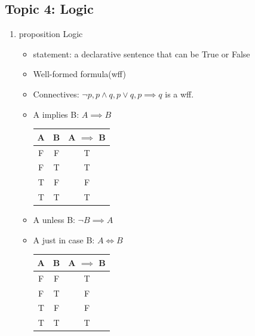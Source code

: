\documentclass[11pt, a4paper]{article}
\begin{document}
\begin{multicols}{3}
\section*{Topic 4: Logic}
    \begin{enumerate}
        \item proposition Logic
            \begin{itemize}
                \item statement: a declarative sentence that can be True or False
                \item Well-formed formula(wff)
                \item Connectives: $\lnot p, p \land q, p \lor q, p\implies q$ is a wff.
                \item A implies B: $A \implies B$\\
                    \begin{tabular}{|c|c|c|}
                        \hline
                        A & B & A $\implies$ B\\
                        \hline
                        F & F & T\\
                        \hline
                        F & T & T\\
                        \hline
                        T & F & F\\
                        \hline
                        T & T & T\\
                        \hline
                    \end{tabular}
                \item A unless B: $\lnot B \implies A$
                \item A just in case B: $A \iff B$\\
                    \begin{tabular}{|c|c|c|}
                        \hline
                        A & B & A $\implies$ B\\
                        \hline
                        F & F & T\\
                        \hline
                        F & T & F\\
                        \hline
                        T & F & F\\
                        \hline
                        T & T & T\\
                        \hline
                    \end{tabular}\\

\end{itemize}
\end{enumerate}
\end{multicols}
\end{document}
